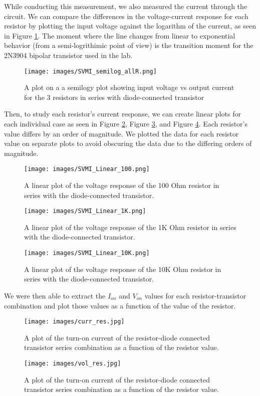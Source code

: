 \documentclass{article}
\begin{document}
While conducting this measurement, we also measured the current through the circuit. We can compare the differences in the  voltage-current response for each resistor by plotting the input voltage against the logarithm of the current, as seen in Figure \ref{fig:test6}.  The moment where the line changes from linear to exponential behavior (from a semi-logrithimic point of view) is the transition moment for the 2N3904 bipolar transistor used in the lab.
\begin{figure}[H]   
  \centering        
  \texttt{[image: images/SVMI\_semilog\_allR.png]}
  \caption{A plot on a a semilogy  plot showing input voltage vs output current for the 3 resistors in series with diode-connected transistor}
  \label{fig:test6}
\end{figure}
Then, to study each resistor's current response, we can create linear plots for each individual case as seen in Figure \ref{fig:test7}, Figure \ref{fig:test8}, and Figure \ref{fig:test9}. Each resistor's value differs by an order of magnitude. We plotted the data for each resistor value on separate plots to avoid obscuring the data due to the differing orders of magnitude.
\begin{figure}[H]   
  \centering        
  \texttt{[image: images/SVMI\_Linear\_100.png]}
  \caption{A linear plot of the voltage response of the 100 Ohm resistor in series with the diode-connected transistor.}
  \label{fig:test7}
\end{figure}
\begin{figure}[H]   
  \centering        
  \texttt{[image: images/SVMI\_Linear\_1K.png]}
  \caption{A linear plot of the voltage response of the 1K Ohm resistor in series with the diode-connected transistor.}
  \label{fig:test8}
\end{figure}
\begin{figure}[H]   
  \centering        
  \texttt{[image: images/SVMI\_Linear\_10K.png]}
  \caption{A linear plot of the voltage response of the 10K Ohm resistor in series with the diode-connected transistor.}
  \label{fig:test9}
\end{figure}

We were then able to extract the $I_{on}$ and $V_{on}$ values for each resistor-transistor combination and plot those values as a function of the value of the resistor. 
\begin{figure}[H]   
  \centering        
  \texttt{[image: images/curr\_res.jpg]}
  \caption{A plot of the turn-on current of the resistor-diode connected transistor series combination as a function of the resistor value.}
  \label{fig:test10}
\end{figure}
\begin{figure}[H]   
  \centering        
  \texttt{[image: images/vol\_res.jpg]}
  \caption{A plot of the turn-on current of the resistor-diode connected transistor series combination as a function of the resistor value.}
  \label{fig:test11}
\end{figure}
\end{document}
